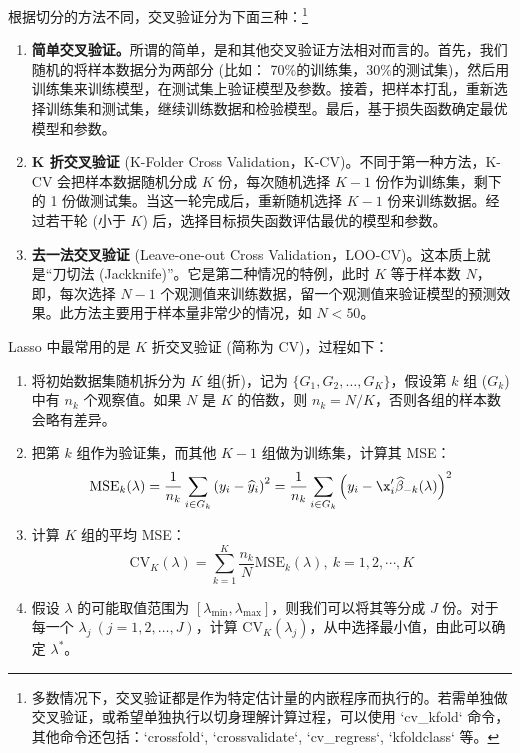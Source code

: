 
根据切分的方法不同，交叉验证分为下面三种：\footnote{%
   多数情况下，交叉验证都是作为特定估计量的内嵌程序而执行的。若需单独做交叉验证，或希望单独执行以切身理解计算过程，可以使用 `cv\_kfold` 命令，其他命令还包括：`crossfold`, `crossvalidate`,  `cv\_regress`, `kfoldclass` 等。
}

\begin{enumerate}
\item \textbf{简单交叉验证。}所谓的简单，是和其他交叉验证方法相对而言的。首先，我们随机的将样本数据分为两部分 (比如： 70\%的训练集，30\%的测试集)，然后用训练集来训练模型，在测试集上验证模型及参数。接着，把样本打乱，重新选择训练集和测试集，继续训练数据和检验模型。最后，基于损失函数确定最优模型和参数。
\item \textbf{K 折交叉验证} (K-Folder Cross Validation，K-CV)。不同于第一种方法，K-CV 会把样本数据随机分成 $K$ 份，每次随机选择 $K-1$ 份作为训练集，剩下的 1 份做测试集。当这一轮完成后，重新随机选择 $K-1$ 份来训练数据。经过若干轮 (小于 $K$) 后，选择目标损失函数评估最优的模型和参数。
\item \textbf{去一法交叉验证} (Leave-one-out Cross Validation，LOO-CV)。这本质上就是“刀切法 (Jackknife)”。它是第二种情况的特例，此时 $K$ 等于样本数 $N$，即，每次选择 $N-1$ 个观测值来训练数据，留一个观测值来验证模型的预测效果。此方法主要用于样本量非常少的情况，如 $N<50$。
\end{enumerate}

Lasso 中最常用的是 $K$ 折交叉验证 (简称为 CV)，过程如下：
\begin{enumerate}
\item 将初始数据集随机拆分为 $K$ 组(折)，记为 $\{G_{1}, G_{2}, \ldots,G_{K}\}$，假设第 $k$ 组 ($G_{k}$) 中有 $n_{k}$ 个观察值。如果 $N$ 是 $K$ 的倍数，则 $n_{k}=N / K$，否则各组的样本数会略有差异。
\item 把第 $k$ 组作为验证集，而其他 $K-1$ 组做为训练集，计算其 MSE：
$$
\mathrm{MSE}_{k}(\lambda) =
\frac{1}{n_k}\sum_{i \in G_{k}}\left(y_{i}-\widehat{y}_{i}\right)^{2}
= \frac{1}{n_k}\sum_{i \in G_{k}}\left(y_{i}-\x_i' \widehat{\beta}_{-k}(\lambda)\right)^{2}
$$
\item 计算 $K$ 组的平均 MSE：
$$
\mathrm{CV}_{K}(\lambda)=\sum_{k=1}^{K} \frac{n_{k}}{N} \mathrm{MSE}_{k}(\lambda), \  k=1,2,\cdots,K
$$
\item 假设 $\lambda$ 的可能取值范围为 $[\lambda_{\text{min}},\lambda_{\text{max}}]$，则我们可以将其等分成 $J$ 份。对于每一个 $\lambda_j\ (j=1,2,\ldots,J)$，计算 $\mathrm{CV}_{K}(\lambda_j)$，从中选择最小值，由此可以确定 $\lambda^*$。
\end{enumerate}

